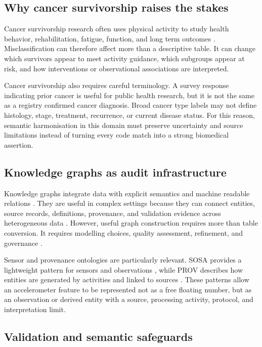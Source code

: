 \documentclass[final,5p,times,twocolumn]{elsarticle}
\begin{document}
\subsection{Why cancer survivorship raises the stakes}

Cancer survivorship research often uses physical activity to study health behavior, rehabilitation, fatigue, function, and long term outcomes \cite{rock2022acs,schmitz2019exercise}. Misclassification can therefore affect more than a descriptive table. It can change which survivors appear to meet activity guidance, which subgroups appear at risk, and how interventions or observational associations are interpreted.

Cancer survivorship also requires careful terminology. A survey response indicating prior cancer is useful for public health research, but it is not the same as a registry confirmed cancer diagnosis. Broad cancer type labels may not define histology, stage, treatment, recurrence, or current disease status. For this reason, semantic harmonisation in this domain must preserve uncertainty and source limitations instead of turning every code match into a strong biomedical assertion.

\subsection{Knowledge graphs as audit infrastructure}

Knowledge graphs integrate data with explicit semantics and machine readable relations \cite{hogan2021knowledge,ji2022survey}. They are useful in complex settings because they can connect entities, source records, definitions, provenance, and validation evidence across heterogeneous data \cite{noy2019industry}. However, useful graph construction requires more than table conversion. It requires modelling choices, quality assessment, refinement, and governance \cite{paulheim2017refinement,zaveri2016quality}.

Sensor and provenance ontologies are particularly relevant. SOSA provides a lightweight pattern for sensors and observations \cite{janowicz2019sosa}, while PROV describes how entities are generated by activities and linked to sources \cite{moreau2015prov}. These patterns allow an accelerometer feature to be represented not as a free floating number, but as an observation or derived entity with a source, processing activity, protocol, and interpretation limit.

\subsection{Validation and semantic safeguards}
\end{document}
